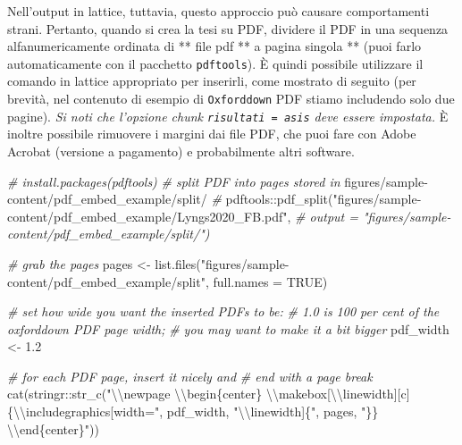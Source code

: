 \documentclass[a4paper, 11pt, nobind]{templates/ociamthesis}
\newenvironment{Shaded}{\begin{snugshade}}{\end{snugshade}}
\newcommand{\AttributeTok}[1]{\textcolor[rgb]{0.77,0.63,0.00}{#1}}
\newcommand{\CommentTok}[1]{\textcolor[rgb]{0.56,0.35,0.01}{\textit{#1}}}
\newcommand{\ConstantTok}[1]{\textcolor[rgb]{0.00,0.00,0.00}{#1}}
\newcommand{\FloatTok}[1]{\textcolor[rgb]{0.00,0.00,0.81}{#1}}
\newcommand{\FunctionTok}[1]{\textcolor[rgb]{0.00,0.00,0.00}{#1}}
\newcommand{\NormalTok}[1]{#1}
\newcommand{\OtherTok}[1]{\textcolor[rgb]{0.56,0.35,0.01}{#1}}
\newcommand{\SpecialCharTok}[1]{\textcolor[rgb]{0.00,0.00,0.00}{#1}}
\newcommand{\StringTok}[1]{\textcolor[rgb]{0.31,0.60,0.02}{#1}}
\renewenvironment{Shaded}
{
  \vspace{10pt}%
  \begin{snugshade}%
}{%
  \end{snugshade}%
  \vspace{8pt}%
}
\begin{document}
Nell'output in lattice, tuttavia, questo approccio può causare comportamenti strani.
Pertanto, quando si crea la tesi su PDF, dividere il PDF in una sequenza alfanumericamente ordinata di ** file pdf ** a pagina singola ** (puoi farlo automaticamente con il pacchetto \texttt{pdftools}). È quindi possibile utilizzare il comando in lattice appropriato per inserirli, come mostrato di seguito (per brevità, nel contenuto di esempio di \texttt{Oxforddown} PDF stiamo includendo solo due pagine).
\emph{Si noti che l'opzione chunk \texttt{risultati\ =\ \textquotesingle{}asis\textquotesingle{}} deve essere impostata.}
È inoltre possibile rimuovere i margini dai file PDF, che puoi fare con Adobe Acrobat (versione a pagamento) e probabilmente altri software.

\begin{Shaded}
\begin{Highlighting}[]
\CommentTok{\# install.packages(pdftools)}
\CommentTok{\# split PDF into pages stored in}
\NormalTok{    figures}\SpecialCharTok{/}\NormalTok{sample}\SpecialCharTok{{-}}\NormalTok{content}\SpecialCharTok{/}\NormalTok{pdf\_embed\_example}\SpecialCharTok{/}\NormalTok{split}\SpecialCharTok{/}
\CommentTok{\#}
\NormalTok{    pdftools}\SpecialCharTok{::}\FunctionTok{pdf\_split}\NormalTok{(}\StringTok{"figures/sample{-}content/pdf\_embed\_example/Lyngs2020\_FB.pdf"}\NormalTok{,}
\CommentTok{\# output = "figures/sample{-}content/pdf\_embed\_example/split/")}

\CommentTok{\# grab the pages}
\NormalTok{pages }\OtherTok{\textless{}{-}} \FunctionTok{list.files}\NormalTok{(}\StringTok{"figures/sample{-}content/pdf\_embed\_example/split"}\NormalTok{,}
    \AttributeTok{full.names =} \ConstantTok{TRUE}\NormalTok{)}

\CommentTok{\# set how wide you want the inserted PDFs to be:}
\CommentTok{\# 1.0 is 100 per cent of the oxforddown PDF page width;}
\CommentTok{\# you may want to make it a bit bigger}
\NormalTok{pdf\_width }\OtherTok{\textless{}{-}} \FloatTok{1.2}

\CommentTok{\# for each PDF page, insert it nicely and}
\CommentTok{\# end with a page break}
\FunctionTok{cat}\NormalTok{(stringr}\SpecialCharTok{::}\FunctionTok{str\_c}\NormalTok{(}\StringTok{"}\SpecialCharTok{\textbackslash{}\textbackslash{}}\StringTok{newpage }\SpecialCharTok{\textbackslash{}\textbackslash{}}\StringTok{begin\{center\}}
\StringTok{    }\SpecialCharTok{\textbackslash{}\textbackslash{}}\StringTok{makebox[}\SpecialCharTok{\textbackslash{}\textbackslash{}}\StringTok{linewidth][c]\{}\SpecialCharTok{\textbackslash{}\textbackslash{}}\StringTok{includegraphics[width="}\NormalTok{, pdf\_width,}
    \StringTok{"}\SpecialCharTok{\textbackslash{}\textbackslash{}}\StringTok{linewidth]\{"}\NormalTok{, pages, }\StringTok{"\}\} }\SpecialCharTok{\textbackslash{}\textbackslash{}}\StringTok{end\{center\}"}\NormalTok{))}
\end{Highlighting}
\end{Shaded}
\end{document}
